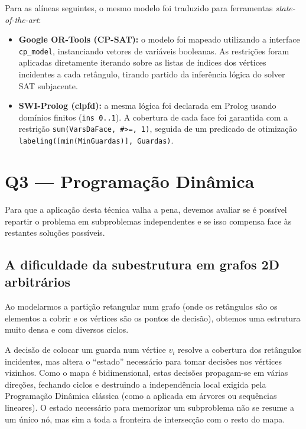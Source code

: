 \documentclass[11pt,a4paper]{article}
\begin{document}
Para as alíneas seguintes, o mesmo modelo foi traduzido para
ferramentas \emph{state-of-the-art}:

\begin{itemize}[topsep=2pt,itemsep=2pt]
  \item \textbf{Google OR-Tools (CP-SAT):} o modelo foi mapeado
    utilizando a interface \texttt{cp\_model}, instanciando vetores de
    variáveis booleanas. As restrições foram aplicadas diretamente
    iterando sobre as listas de índices dos vértices incidentes a cada
    retângulo, tirando partido da inferência lógica do solver SAT
    subjacente.
  \item \textbf{SWI-Prolog (clpfd):} a mesma lógica foi declarada em
    Prolog usando domínios finitos (\texttt{ins 0..1}). A cobertura de
    cada face foi garantida com a restrição
    \texttt{sum(VarsDaFace, \#>=, 1)}, seguida de um predicado de
    otimização \texttt{labeling([min(MinGuardas)], Guardas)}.
\end{itemize}


\section{Q3 --- Programação Dinâmica}

Para que a aplicação desta técnica valha a pena, devemos avaliar se é
possível repartir o problema em subproblemas independentes e se isso
compensa face às restantes soluções possíveis.

\subsection{A dificuldade da subestrutura em grafos 2D arbitrários}

Ao modelarmos a partição retangular num grafo (onde os retângulos são
os elementos a cobrir e os vértices são os pontos de decisão),
obtemos uma estrutura muito densa e com diversos ciclos.

A decisão de colocar um guarda num vértice $v_i$ resolve a cobertura
dos retângulos incidentes, mas altera o ``estado'' necessário para
tomar decisões nos vértices vizinhos. Como o mapa é bidimensional,
estas decisões propagam-se em várias direções, fechando ciclos e
destruindo a independência local exigida pela Programação Dinâmica
clássica (como a aplicada em árvores ou sequências lineares). O estado
necessário para memorizar um subproblema não se resume a um único nó,
mas sim a toda a fronteira de intersecção com o resto do mapa.
\end{document}
